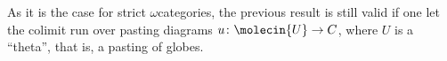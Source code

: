 \begin{rmk} \label{rmk:thetas_are_dense}
    As it is the case for strict \( \omega \)\nbd categories, the previous result is still valid if one let the colimit run over pasting diagrams \( u \colon \molecin{U} \to C \), where \( U \) is a ``theta'', that is, a pasting of globes.
\end{rmk}








